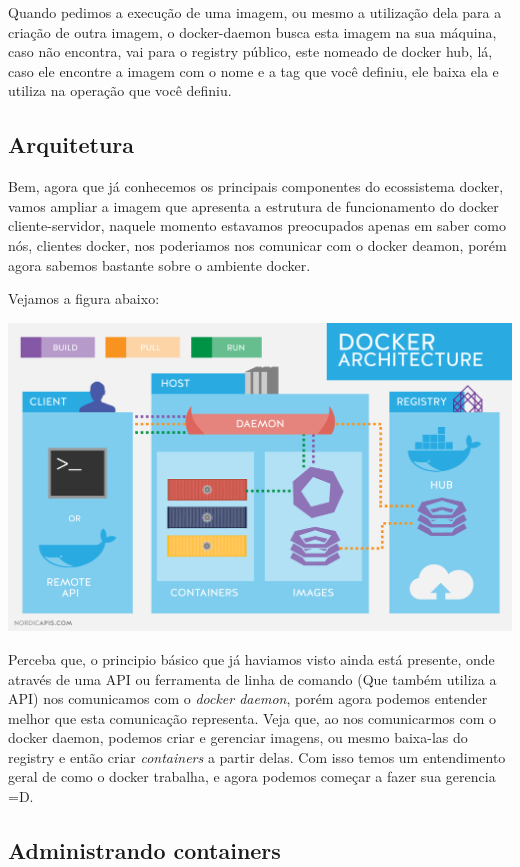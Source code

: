 \documentclass[]{article}
\begin{document}
Quando pedimos a execução de uma imagem, ou mesmo a utilização dela para a criação de outra imagem, o docker-daemon busca esta imagem na sua máquina, caso não encontra, vai para o registry público, este nomeado de docker hub, lá, caso ele encontre a imagem com o nome e a tag que você definiu, ele baixa ela e utiliza na operação que você definiu.

\hypertarget{arquitetura}{%
\subsection{Arquitetura}\label{arquitetura}}

Bem, agora que já conhecemos os principais componentes do ecossistema docker, vamos ampliar a imagem que apresenta a estrutura de funcionamento do docker cliente-servidor, naquele momento estavamos preocupados apenas em saber como nós, clientes docker, nos poderiamos nos comunicar com o docker deamon, porém agora sabemos bastante sobre o ambiente docker.

Vejamos a figura abaixo:

\includegraphics{res/docker_arch.png}

Perceba que, o principio básico que já haviamos visto ainda está presente, onde através de uma API ou ferramenta de linha de comando (Que também utiliza a API) nos comunicamos com o \emph{docker daemon}, porém agora podemos entender melhor que esta comunicação representa. Veja que, ao nos comunicarmos com o docker daemon, podemos criar e gerenciar imagens, ou mesmo baixa-las do registry e então criar \emph{containers} a partir delas. Com isso temos um entendimento geral de como o docker trabalha, e agora podemos começar a fazer sua gerencia =D.

\hypertarget{administrando-containers}{%
\subsection{Administrando containers}\label{administrando-containers}}
\end{document}
